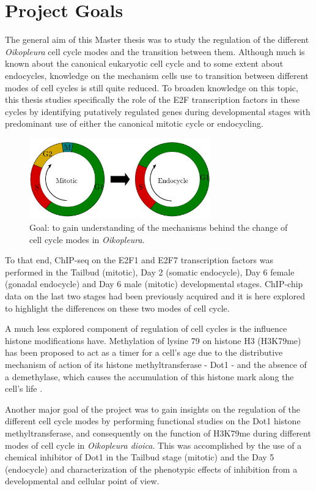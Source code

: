 \documentclass[11pt,twoside,a4paper]{report}
\begin{document}
	\clearpage
	\section{Project Goals}
		The general aim of this Master thesis was to study the regulation of the different \textit{Oikopleura} cell cycle modes and the transition between them. Although much is known about the canonical eukaryotic cell cycle and to some extent about endocycles, knowledge on the mechanism cells use to transition between different modes of cell cycles is still quite reduced.	 To broaden knowledge on this topic, this thesis studies specifically the role of the E2F transcription factors in these cycles by identifying putatively regulated genes during developmental stages with predominant use of either the canonical mitotic cycle or endocycling.
		
		\begin{figure}[here]
			\centering
			\includegraphics[width=0.7\textwidth]{pngs/change_cell-cycle.png}
			\caption{Goal: to gain understanding of the mechanisms behind the change of cell cycle modes in \textit{Oikopleura}.}
			\label{fig:goal_cycles}
		\end{figure}
		
		To that end, ChIP-seq on the E2F1 and E2F7 transcription factors was performed in the Tailbud (mitotic), Day 2 (somatic endocycle), Day 6 female (gonadal endocycle) and Day 6 male (mitotic) developmental stages. ChIP-chip data on the last two stages had been previously acquired and it is here explored to highlight the differences on these two modes of cell cycle.
		
		A much less explored component of regulation of cell cycles is the influence histone modifications have. Methylation of lysine 79 on histone H3 (H3K79me) has been proposed to act as a timer for a cell's age due to the distributive mechanism of action of its histone methyltransferase - Dot1 - and the absence of a demethylase, which causes the accumulation of this histone mark along the cell's life	.
		
		Another major goal of the project was to gain insights on the regulation of the different cell cycle modes by performing functional studies on the Dot1 histone methyltransferase, and consequently on the function of H3K79me during different modes of cell cycle in \textit{Oikopleura dioica}. This was accomplished by the use of a chemical inhibitor of Dot1 in the Tailbud stage (mitotic) and the Day 5 (endocycle) and characterization of the phenotypic effects of inhibition from a developmental and cellular point of view.
		
\end{document}
